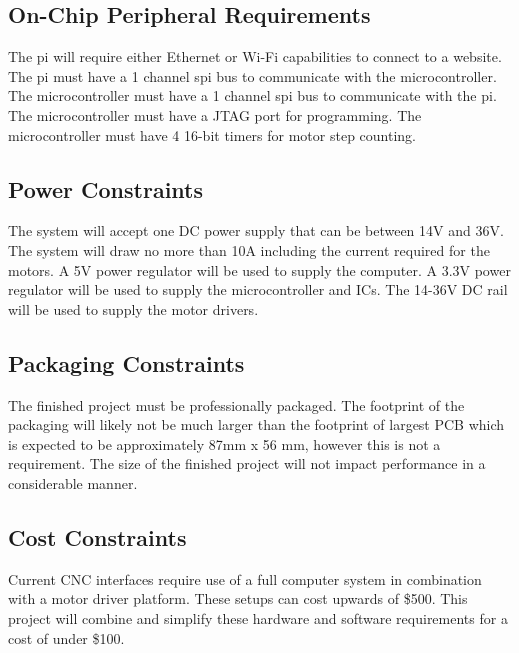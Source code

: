 \subsection{On-Chip Peripheral Requirements}
The \gls{pi} will require either Ethernet or Wi-Fi capabilities to connect to a website.
The \gls{pi} must have a 1 channel \gls{spi} bus to communicate with the microcontroller. 
The microcontroller must have a 1 channel \gls{spi} bus to communicate with the \gls{pi}.
The microcontroller must have a JTAG port for programming.
The microcontroller must have 4 16-bit timers for motor step counting.

\subsection{Power Constraints}
The system will accept one DC power supply that can be between 14V and 36V.
The system will draw no more than 10A including the current required for the motors.
A 5V power regulator will be used to supply the computer.
A 3.3V power regulator will be used to supply the microcontroller and ICs.
The 14-36V DC rail will be used to supply the motor drivers. 

\subsection{Packaging Constraints}
The finished project must be professionally packaged.
The footprint of the packaging will likely not be much larger than the footprint of largest PCB which is expected to be approximately 87mm x 56 mm, however this is not a requirement.
The size of the finished project will not impact performance in a considerable manner.

\subsection{Cost Constraints}
Current CNC interfaces require use of a full computer system in combination with a motor driver platform.
These setups can cost upwards of \$500.
This project will combine and simplify these hardware and software requirements for a cost of under \$100.